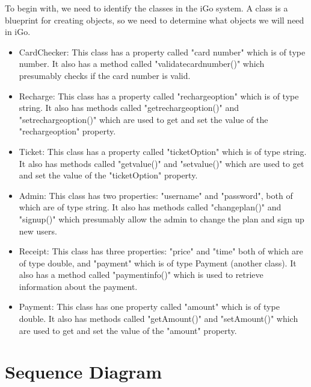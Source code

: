 \documentclass[a4paper, 11pt]{report}
\begin{document}
To begin with, we need to identify the classes in the iGo system. A class is a blueprint for creating objects, so we need to determine what objects we will need in iGo. \\
\begin{itemize}

  

   \item CardChecker: This class has a property called "card number" which is of type number. It also has a method called "validatecardnumber()" which presumably checks if the card number is valid.

    \item Recharge: This class has a property called "rechargeoption" which is of type string. It also has methods called "getrechargeoption()" and "setrechargeoption()" which are used to get and set the value of the "rechargeoption" property.

   \item Ticket: This class has a property called "ticketOption" which is of type string. It also has methods called "getvalue()" and "setvalue()" which are used to get and set the value of the "ticketOption" property.

   \item Admin: This class has two properties: "username" and "password", both of which are of type string. It also has methods called "changeplan()" and "signup()" which presumably allow the admin to change the plan and sign up new users.

   \item Receipt: This class has three properties: "price" and "time" both of which are of type double, and "payment" which is of type Payment (another class). It also has a method called "paymentinfo()" which is used to retrieve information about the payment.

   \item Payment: This class has one property called "amount" which is of type double. It also has methods called "getAmount()" and "setAmount()" which are used to get and set the value of the "amount" property.
\end{itemize}

\clearpage
\renewcommand{\thesection}{7.\arabic{section}} %
\section{Sequence Diagram}
\end{document}

